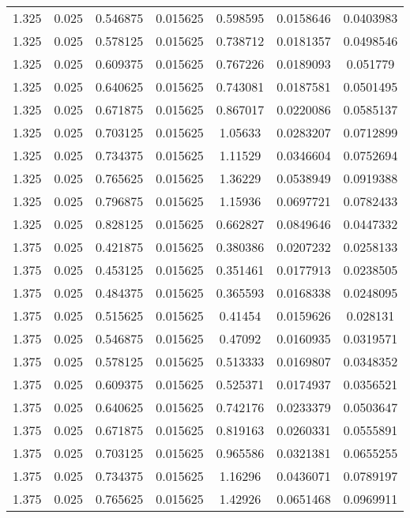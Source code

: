 \begin{table}[bh]
\begin{center}
{\begin{tabular}{ccccccc}
1.325	 & 0.025 & 	0.546875	 & 0.015625	 & 0.598595	 & 0.0158646	 & 0.0403983 \\ 
1.325	 & 0.025 & 	0.578125	 & 0.015625	 & 0.738712	 & 0.0181357	 & 0.0498546 \\ 
1.325	 & 0.025 & 	0.609375	 & 0.015625	 & 0.767226	 & 0.0189093	 & 0.051779 \\ 
1.325	 & 0.025 & 	0.640625	 & 0.015625	 & 0.743081	 & 0.0187581	 & 0.0501495 \\ 
1.325	 & 0.025 & 	0.671875	 & 0.015625	 & 0.867017	 & 0.0220086	 & 0.0585137 \\ 
1.325	 & 0.025 & 	0.703125	 & 0.015625	 & 1.05633	 & 0.0283207	 & 0.0712899 \\ 
1.325	 & 0.025 & 	0.734375	 & 0.015625	 & 1.11529	 & 0.0346604	 & 0.0752694 \\ 
1.325	 & 0.025 & 	0.765625	 & 0.015625	 & 1.36229	 & 0.0538949	 & 0.0919388 \\ 
1.325	 & 0.025 & 	0.796875	 & 0.015625	 & 1.15936	 & 0.0697721	 & 0.0782433 \\ 
1.325	 & 0.025 & 	0.828125	 & 0.015625	 & 0.662827	 & 0.0849646	 & 0.0447332 \\ 
1.375	 & 0.025 & 	0.421875	 & 0.015625	 & 0.380386	 & 0.0207232	 & 0.0258133 \\ 
1.375	 & 0.025 & 	0.453125	 & 0.015625	 & 0.351461	 & 0.0177913	 & 0.0238505 \\ 
1.375	 & 0.025 & 	0.484375	 & 0.015625	 & 0.365593	 & 0.0168338	 & 0.0248095 \\ 
1.375	 & 0.025 & 	0.515625	 & 0.015625	 & 0.41454	 & 0.0159626	 & 0.028131 \\ 
1.375	 & 0.025 & 	0.546875	 & 0.015625	 & 0.47092	 & 0.0160935	 & 0.0319571 \\ 
1.375	 & 0.025 & 	0.578125	 & 0.015625	 & 0.513333	 & 0.0169807	 & 0.0348352 \\ 
1.375	 & 0.025 & 	0.609375	 & 0.015625	 & 0.525371	 & 0.0174937	 & 0.0356521 \\ 
1.375	 & 0.025 & 	0.640625	 & 0.015625	 & 0.742176	 & 0.0233379	 & 0.0503647 \\ 
1.375	 & 0.025 & 	0.671875	 & 0.015625	 & 0.819163	 & 0.0260331	 & 0.0555891 \\ 
1.375	 & 0.025 & 	0.703125	 & 0.015625	 & 0.965586	 & 0.0321381	 & 0.0655255 \\ 
1.375	 & 0.025 & 	0.734375	 & 0.015625	 & 1.16296	 & 0.0436071	 & 0.0789197 \\ 
1.375	 & 0.025 & 	0.765625	 & 0.015625	 & 1.42926	 & 0.0651468	 & 0.0969911 \\ 

\end{tabular}}
\end{center}
\end{table}
